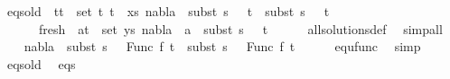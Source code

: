 \begin{isabellebody}
\ eqs{\isacharunderscore}{\kern0pt}old{\isacharcolon}{\kern0pt}\ {\isachardoublequoteopen}{\isasymforall}\ {\isacharparenleft}{\kern0pt}t{}{\isacharcomma}{\kern0pt}t{}{\isacharparenright}{\kern0pt}\ {\isasymin}\ set\ {\isacharparenleft}{\kern0pt}{\isacharparenleft}{\kern0pt}t{}{\isacharcomma}{\kern0pt}\ t{}{\isacharparenright}{\kern0pt}\ {\isacharhash}{\kern0pt}\ xs{\isacharparenright}{\kern0pt}{\isachardot}{\kern0pt}\ nabla{}\ {\isasymturnstile}\ subst\ {\isacharparenleft}{\kern0pt}s{}\ {\isasymbullet}\ {\isacharbrackleft}{\kern0pt}{\isacharbrackright}{\kern0pt}{\isacharparenright}{\kern0pt}\ t{}\ {\isasymapprox}\ subst\ {\isacharparenleft}{\kern0pt}s{}\ {\isasymbullet}\ {\isacharbrackleft}{\kern0pt}{\isacharbrackright}{\kern0pt}{\isacharparenright}{\kern0pt}\ t{}{\isachardoublequoteclose}\ \isanewline
\ \ \ \ \ \ fresh{\isacharcolon}{\kern0pt}\ {\isachardoublequoteopen}{\isasymforall}\ {\isacharparenleft}{\kern0pt}a{\isacharcomma}{\kern0pt}t{\isacharparenright}{\kern0pt}\ {\isasymin}\ set\ ys{\isachardot}{\kern0pt}\ nabla{}\ {\isasymturnstile}\ a\ {\isasymsharp}\ subst\ {\isacharparenleft}{\kern0pt}s{}\ {\isasymbullet}\ {\isacharbrackleft}{\kern0pt}{\isacharbrackright}{\kern0pt}{\isacharparenright}{\kern0pt}\ t{\isachardoublequoteclose}\isanewline
\ \ \ \ \isamarkupfalse%
\ all{\isacharunderscore}{\kern0pt}solutions{\isacharunderscore}{\kern0pt}def\ \isamarkupfalse%
\ simp{\isacharunderscore}{\kern0pt}all\isanewline
\ \ \isamarkupfalse%
\ {\isachardoublequoteopen}nabla{}\ {\isasymturnstile}\ subst\ {\isacharparenleft}{\kern0pt}s{}\ {\isasymbullet}\ {\isacharbrackleft}{\kern0pt}{\isacharbrackright}{\kern0pt}{\isacharparenright}{\kern0pt}\ {\isacharparenleft}{\kern0pt}Func\ f\ t{}{\isacharparenright}{\kern0pt}\ {\isasymapprox}\ subst\ {\isacharparenleft}{\kern0pt}s{}\ {\isasymbullet}\ {\isacharbrackleft}{\kern0pt}{\isacharbrackright}{\kern0pt}{\isacharparenright}{\kern0pt}\ {\isacharparenleft}{\kern0pt}Func\ f\ t{}{\isacharparenright}{\kern0pt}{\isachardoublequoteclose}\isanewline
\ \ \ \ \isamarkupfalse%
\ equ{\isacharunderscore}{\kern0pt}func\ \isamarkupfalse%
\ simp\isanewline
\ \ \isamarkupfalse%
\ eqs{\isacharunderscore}{\kern0pt}old\ \isamarkupfalse%
\ eqs{\isacharcolon}{\kern0pt}\isanewline

\end{isabellebody}
